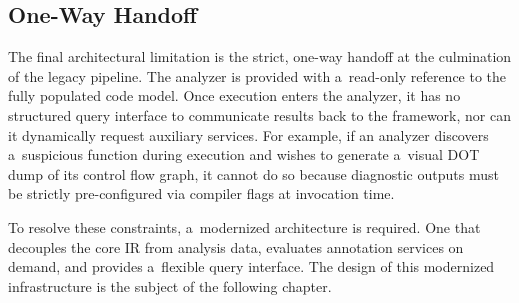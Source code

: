\documentclass[xpsejal00-gcc-plugin.tex]{subfiles}
\begin{document}
\subsection*{One-Way Handoff}\label{sub:handoff}

The final architectural limitation is the strict, one-way handoff at the culmination of the legacy pipeline.
The analyzer is provided with a~read-only reference to the fully populated code model.
Once execution enters the analyzer, it has no structured query interface to communicate results back to the framework, nor can it dynamically request auxiliary services.
For example, if an analyzer discovers a~suspicious function during execution and wishes to generate a~visual DOT dump of its control flow graph, it cannot do so because diagnostic outputs must be strictly pre-configured via compiler flags at invocation time.

\bigskip
\noindent

To resolve these constraints, a~modernized architecture is required.
One that decouples the core IR from analysis data, evaluates annotation services on demand, and provides a~flexible query interface.
The design of this modernized infrastructure is the subject of the following chapter.
\end{document}
